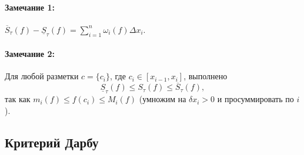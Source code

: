 \documentclass{article}
\theoremstyle{plain}
\theoremstyle{definition}
\theoremstyle{remark}
\renewcommand{\*}{\cdot}
\begin{document}
\paragraph{Замечание 1:} $\overline{S}_{\tau}(f) - \underline{S}_{\tau}(f) =\sum_{i=1}^n \omega_i(f)\Delta x_i$. 

\paragraph{Замечание 2:} Для любой разметки $c=\{c_i\}$, где $c_i\in[x_{i-1}, x_i]$, выполнено 
$$\underline{S}_{\tau}(f) \leq S_{\tau}(f) \leq \overline{S}_{\tau}(f),$$
так как $m_i(f) \leq f(c_i) \leq M_i(f)$ (умножим на $\delta x_i > 0$ и просуммировать по $i$).

\subsection{Критерий Дарбу}
\end{document}
